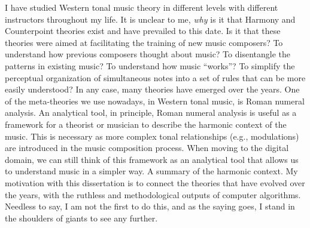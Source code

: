 I have studied Western tonal music theory in different
levels with different instructors throughout my life. It is
unclear to me, \emph{why} is it that Harmony and
Counterpoint theories exist and have prevailed to this date.
Is it that these theories were aimed at facilitating the
training of new music composers? To understand how previous
composers thought about music? To disentangle the patterns
in existing music? To understand how music ``works''? To
simplify the perceptual organization of simultaneous notes
into a set of rules that can be more easily understood? In
any case, many theories have emerged over the years. One of
the meta-theories we use nowadays, in Western tonal music,
is Roman numeral analysis. An analytical tool, in principle,
Roman numeral analysis is useful as a framework for a
theorist or musician to describe the harmonic context of the
music. This is necessary as more complex tonal relationships
(e.g., modulations) are introduced in the music composition
process. When moving to the digital domain, we can still
think of this framework as an analytical tool that allows us
to understand music in a simpler way. A summary of the
harmonic context. My motivation with this dissertation is to
connect the theories that have evolved over the years, with
the ruthless and methodological outputs of computer
algorithms. Needless to say, I am not the first to do this,
and as the saying goes, I stand in the shoulders of giants
to see any further.
